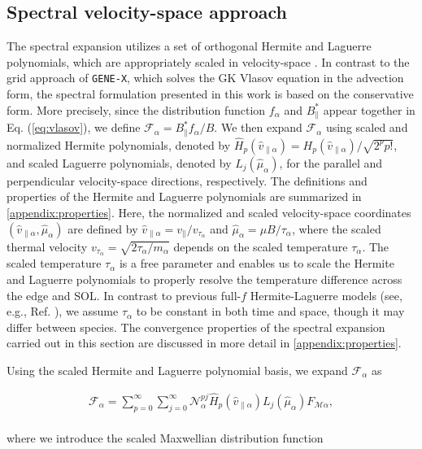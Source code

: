 \documentclass[preprint,12pt]{elsarticle}
\begin{document}
\subsection{Spectral velocity-space approach}
\label{subsec:velocityspace}

The spectral expansion utilizes a set of orthogonal Hermite and Laguerre polynomials, which are appropriately scaled in velocity-space \cite{frei2023,frei2023b}. In contrast to the grid approach of \verb|GENE-X|, which solves the GK Vlasov equation in the advection form, the spectral formulation presented in this work is based on the conservative form. More precisely, since the distribution function $f_\alpha$ and $B_\parallel^*$ appear together in Eq. (\ref{eq:vlasov}), we define $\mathcal{F}_\alpha = B_\parallel^* f_\alpha / B$. We then expand $\mathcal{F}_\alpha$ using scaled and normalized Hermite polynomials, denoted by $\hat H_p(\hat v_{\parallel \alpha}) = H_p(\hat v_{\parallel \alpha}) / \sqrt{2^p p!}$, and scaled Laguerre polynomials, denoted by $L_j(\hat \mu_\alpha)$, for the parallel and perpendicular velocity-space directions, respectively. The definitions and properties of the Hermite and Laguerre polynomials are summarized in \ref{appendix:properties}. Here, the normalized and scaled velocity-space coordinates $(\hat v_{\parallel \alpha}, \hat \mu_\alpha)$ are defined by $\hat v_{\| \alpha} = v_{\parallel} / v_{\tau_\alpha}$ and $\hat \mu_\alpha = \mu B / \tau_{\alpha}$, where the scaled thermal velocity $v_{\tau_\alpha} = \sqrt{2 \tau_\alpha / m_\alpha}$ depends on the scaled temperature $\tau_\alpha$. The scaled temperature $\tau_\alpha$ is a free parameter and enables us to scale the Hermite and Laguerre polynomials to properly resolve the temperature difference across the edge and SOL. In contrast to previous full-$f$ Hermite-Laguerre models (see, e.g., Ref. \cite{frei2020}), we assume $\tau_\alpha$ to be constant in both time and space, though it may differ between species. The convergence properties of the spectral expansion carried out in this section are discussed in more detail in \ref{appendix:properties}.

Using the scaled Hermite and Laguerre polynomial basis, we expand $\mathcal{F}_\alpha$ as

\begin{align} \label{eq:faexpansion}
  \mathcal{F}_\alpha = \sum_{p =0}^{\infty} \sum_{j =0}^\infty \mathcal{N}_\alpha^{pj} \hat H_p(\hat v_{\parallel \alpha}) L_j(\hat \mu_\alpha) F_{\mathcal{M} \alpha},
\end{align}
\\
where we introduce the scaled Maxwellian distribution function
\end{document}
